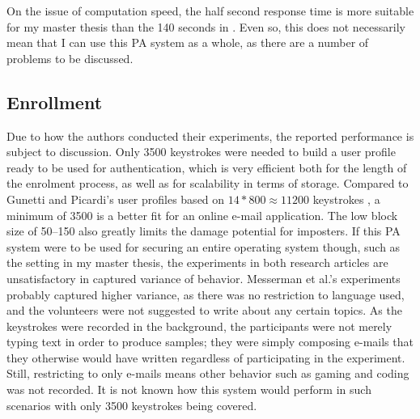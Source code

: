 \documentclass[informationsecurity]{gucmasterproject}
\begin{document}
On the issue of computation speed, the half second response time is more suitable for my master thesis than the 140 seconds in \cite{gnp}.
Even so, this does not necessarily mean that I can use this PA system as a whole, as there are a number of problems to be discussed.

\subsection{Enrollment}
Due to how the authors conducted their experiments, the reported performance is subject to discussion.
Only 3500 keystrokes were needed to build a user profile ready to be used for authentication, which is very efficient both for the length of the enrolment process, as well as for scalability in terms of storage.
Compared to Gunetti and Picardi's user profiles based on $14*800\approx{11200}$ keystrokes \cite{gnp}, a minimum of 3500 is a better fit for an online e-mail application.
The low block size of 50--150 also greatly limits the damage potential for imposters.
If this PA system were to be used for securing an entire operating system though, such as the setting in my master thesis, the experiments in both research articles \cite{gnp, Messerman} are unsatisfactory in captured variance of behavior.
Messerman et al.'s \cite{Messerman} experiments probably captured higher variance, as there was no restriction to language used, and the volunteers were not suggested to write about any certain topics.
As the keystrokes were recorded in the background, the participants were not merely typing text in order to produce samples; they were simply composing e-mails that they otherwise would have written regardless of participating in the experiment.
Still, restricting to only e-mails means other behavior such as gaming and coding was not recorded. 
It is not known how this system would perform in such scenarios with only 3500 keystrokes being covered.
\end{document}
